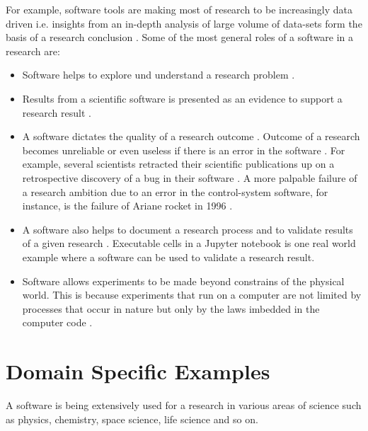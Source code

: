 For example, software tools are making most of research to be increasingly data driven i.e. insights from an in-depth analysis of large volume of data-sets form the basis of a research conclusion . Some of the most general roles of a software in a research are:

\begin{itemize}%

	\item Software helps to explore und understand a research problem \citep{hannay2009scientists}.
	\item Results from a scientific software is presented as an evidence to support a research result \citep{kanewala2014testing}. 
	\item A software dictates the quality of a research outcome \citep{hannay2009scientists}. Outcome of a research becomes unreliable or even useless if there is an error in the software \citep{soergel2014rampant}. For example, several scientists retracted their scientific publications up on a retrospective discovery of a bug in their software \citep{wilson2014best, merali2010computational, miller2006scientist}. A more palpable failure of a research ambition due to an error in the control-system software, for instance, is the failure of Ariane rocket in 1996 \citep{enwiki:1054482061}.  
	\item A software also helps to document a research process and to validate results of a given research \citep{jay2020software}. Executable cells in a Jupyter notebook is one real world example where a software can be used to validate a research result.
	\item Software allows experiments to be made beyond constrains of the physical world. This is because experiments that run on a computer are not limited by processes that occur in nature but only by the laws imbedded in the computer code \citep{wolfram1984computer}. 

\end{itemize}

\section{Domain Specific Examples}
\label{subsec:background:first_section:second_subsection}
A software is being extensively used for a research in various areas of science such as physics, chemistry, space science, life science and so on.

